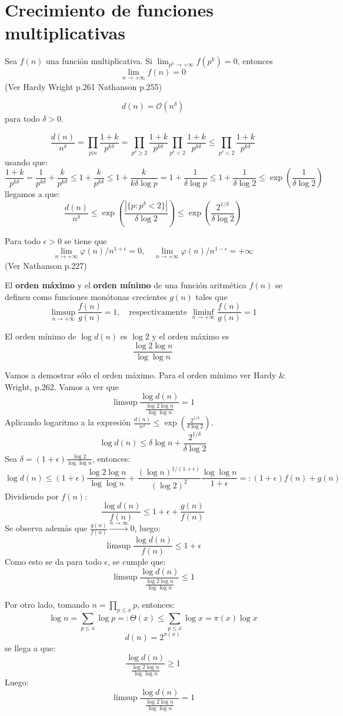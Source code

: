 \documentclass[TAN.tex]{subfiles}
\begin{document}
\section{Crecimiento de funciones multiplicativas}
\begin{teorema}
Sea $f(n)$ una función multiplicativa. Si $\lim_{p^k \to +∞} f(p^k) = 0$, entonces
\[ \lim_{n\to +∞} f(n) = 0 \]
(Ver Hardy Wright p.261 Nathanson p.255)
\end{teorema}
\begin{prop}
\[ d(n) = \mathcal{O}(n^δ) \]
para todo $δ > 0$.
\end{prop}
\begin{dem}
\[ \frac{d(n)}{n^δ} = \prod_{p|n} \frac{1+k}{p^{kδ}} = \prod_{p^δ≥2}\frac{1+k}{p^{kδ}} \prod_{p^δ<2}\frac{1+k}{p^{kδ}} ≤ \prod_{p^δ<2} \frac{1+k}{p^{kδ}}\]
usando que:
\[ \frac{1+k}{p^{kδ}} = \frac{1}{p^{kδ}}+\frac{k}{p^{kδ}} ≤ 1 + \frac{k}{p^{kδ}} ≤ 1 + \frac{k}{kδ\log p} = 1 + \frac{1}{δ\log p} ≤ 1 + \frac{1}{δ\log 2} ≤ \exp\left(\frac{1}{δ\log 2}\right)\]
llegamos a que:
\[ \frac{d(n)}{n^δ} ≤ \exp\left(\frac{|\{p : p^δ<2\}|}{δ\log2}\right) ≤ \exp\left(\frac{2^{1/δ}}{δ\log 2}\right)\]
\end{dem}

\begin{prop}
Para todo $ϵ > 0$ se tiene que
\[ \lim_{n \to +∞} φ(n)/n^{1+ϵ} =0, \quad \lim_{n \to +∞} φ(n)/n^{1-ϵ} = +∞ \]
(Ver Nathanson p.227)
\end{prop}
El \textbf{orden máximo} y el \textbf{orden mínimo} de una función aritmética $f(n)$ se definen como funciones monótonas crecientes $g(n)$ tales que
\[ \limsup_{n\to+∞} \frac{f(n)}{g(n)} = 1, \quad \text{respectivamente }\liminf_{n\to+∞}\frac{f(n)}{g(n)} = 1 \]
\begin{prop}
El orden mínimo de $\log d(n)$ es $\log 2$ y el orden máximo es
\[ \frac{\log 2 \log n}{\log \log n} \]
\end{prop}
\begin{dem}
Vamos a demostrar sólo el orden máximo. Para el orden mínimo ver Hardy \& Wright, p.262. Vamos a ver que
\[ \limsup \frac{\log d(n)}{\frac{\log 2 \log n}{\log \log n}} = 1\]
Aplicando logaritmo a la expresión $\frac{d(n)}{n^δ} ≤ \exp\left(\frac{2^{1/δ}}{δ\log 2}\right)$.
\[
	\log d(n) ≤ δ\log n + \frac{2^{1/δ}}{δ\log 2}
\]
Sea $δ = (1+ϵ)\frac{\log 2}{\log \log n}$, entonces:
\[
	\log d(n) ≤ (1+ϵ) \frac{\log 2 \log n}{\log \log n} + \frac{(\log n)^{1/(1+ϵ)}}{(\log 2)^2} \frac{\log \log n}{1+ϵ} =: (1+ϵ)f(n) + g(n)
\]
Dividiendo por $f(n)$:
\[ 
	\frac{\log d(n)}{f(n)} ≤ 1 + ϵ + \frac{g(n)}{f(n)}
\]
Se observa además que $\frac{g(n)}{f(n)} \xrightarrow{n \to ∞} 0$, luego:
\[ 
	\limsup \frac{\log d(n)}{f(n)} ≤ 1+ϵ
\]
Como esto se da para todo $ϵ$, se cumple que:
\[ 
	\limsup \frac{\log d(n)}{\frac{\log 2 \log n}{\log \log n}} ≤ 1
\]

Por otro lado, tomando $n = \prod_{p≤x} p$, entonces:
\[ \log n = \sum_{p≤x} \log p =: Θ(x) ≤ \sum_{p≤x} \log x = π(x) \log x \]
\[ d(n) = 2^{π(x)} \]
se llega a que:
\[ \frac{\log d(n)}{\frac{\log 2 \log n}{\log \log n}} ≥ 1 \]
Luego:
\[
	\limsup \frac{\log d(n)}{\frac{\log 2 \log n}{\log \log n}} = 1 
\]
\end{dem}
\end{document}
